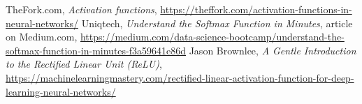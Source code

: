 \begin{thebibliography}{11}
 TheFork.com, \textit{Activation functions}, \url{https://theffork.com/activation-functions-in-neural-networks/}
 Uniqtech, \textit{Understand the Softmax Function in Minutes}, article on Medium.com, \url{https://medium.com/data-science-bootcamp/understand-the-softmax-function-in-minutes-f3a59641e86d}
 Jason Brownlee, \textit{A Gentle Introduction to the Rectified Linear Unit (ReLU)}, \url{https://machinelearningmastery.com/rectified-linear-activation-function-for-deep-learning-neural-networks/}









\end{thebibliography}
